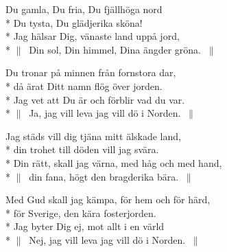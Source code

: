 \begin{SongText}
    \begin{SongVerse}
        Du gamla, Du fria, Du fjällhöga nord\\*%
        Du tysta, Du glädjerika sköna!\\*%
        Jag hälsar Dig, vänaste land uppå jord,\\*%
        $\|\:$ Din sol, Din himmel, Dina ängder gröna. $\:\|$
    \end{SongVerse}
    \begin{SongVerse}
        Du tronar på minnen från fornstora dar,\\*%
        då ärat Ditt namn flög över jorden.\\*%
        Jag vet att Du är och förblir vad du var.\\*%
        $\|\:$ Ja, jag vill leva jag vill dö i Norden. $\:\|$
    \end{SongVerse}
    \begin{SongVerse}
        Jag städs vill dig tjäna mitt älskade land,\\*%
        din trohet till döden vill jag svära.\\*%
        Din rätt, skall jag värna, med håg och med hand,\\*%
        $\|\:$ din fana, högt den bragderika bära. $\:\|$
    \end{SongVerse}
    \begin{SongVerse}
        Med Gud skall jag kämpa, för hem och för härd,\\*%
        för Sverige, den kära fosterjorden.\\*%
        Jag byter Dig ej, mot allt i en värld\\*%
        $\|\:$ Nej, jag vill leva jag vill dö i Norden. $\:\|$
    \end{SongVerse}
\end{SongText}
